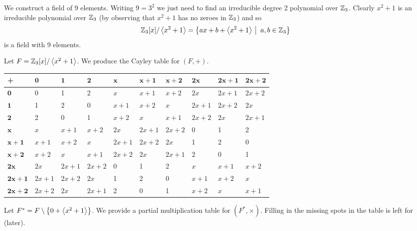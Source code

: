 \begin{example}\label{example-Z3/<x^2+1>}
    We construct a field of 9 elements. Writing $9 = 3^2$ we just need to find an irreducible degree 2 polynomial over $\mathbb{Z}_3$. Clearly $x^2 + 1$ is an irreducible polynomial over $\mathbb{Z}_3$ (by observing that $x^2 + 1$ has no zeroes in $\mathbb{Z}_3$) and so
    \[
        \Z_3[x]/\princ{x^2+1} = \left\{ax+b + \princ{x^2+1} \vert a,b \in \Z_3\right\}
    \]
    is a field with 9 elements.

    Let $F = \mathbb{Z}_3[x]/\left\langle x^2+1\right\rangle$. We produce the Cayley table for $(F, +)$.
    \begin{table}[H]
        \centering
        \fontsize{7pt}{10pt}\selectfont
        \begin{tabular}{|l|l|l|l|l|l|l|l|l|l|}
            \hline
            \textbf{+} & $\boldsymbol{0}$ & $\boldsymbol{1}$ & $\boldsymbol{2}$ & $\boldsymbol{x}$ & $\boldsymbol{x+1}$ & $\boldsymbol{x+2}$ & $\boldsymbol{2x}$ & $\boldsymbol{2x+1}$ & $\boldsymbol{2x+2}$ \\ \hline
            $\boldsymbol{0}$ & 0 & 1 & 2 & $x$ & $x+1$ & $x+2$ & $2x$ & $2x+1$ & $2x+2$ \\ \hline
            $\boldsymbol{1}$ & 1 & 2 & 0 & $x+1$ & $x+2$ & $x$ & $2x+1$ & $2x+2$ & $2x$ \\ \hline
            $\boldsymbol{2}$ & 2 & 0 & 1 & $x+2$ & $x$ & $x+1$ & $2x+2$ & $2x$ & $2x+1$ \\ \hline
            $\boldsymbol{x}$ & $x$ & $x+1$ & $x+2$ & $2x$ & $2x+1$ & $2x+2$ & 0 & 1 & 2 \\ \hline
            $\boldsymbol{x+1}$ & $x+1$ & $x+2$ & $x$ & $2x+1$ & $2x+2$ & $2x$ & 1 & 2 & 0 \\ \hline
            $\boldsymbol{x+2}$ & $x+2$ & $x$ & $x+1$ & $2x+2$ & $2x$ & $2x+1$ & 2 & 0 & 1 \\ \hline
            $\boldsymbol{2x}$ & $2x$ & $2x+1$ & $2x+2$ & 0 & 1 & 2 & $x$ & $x+1$ & $x+2$ \\ \hline
            $\boldsymbol{2x+1}$ & $2x+1$ & $2x+2$ & $2x$ & 1 & 2 & 0 & $x+1$ & $x+2$ & $x$ \\ \hline
            $\boldsymbol{2x+2}$ & $2x+2$ & $2x$ & $2x+1$ & 2 & 0 & 1 & $x+2$ & $x$ & $x+1$ \\ \hline
        \end{tabular}
    \end{table}

    Let $F^\ast = F \setminus \left\{0 + \left\langle x^2+1\right\rangle\right\}$. We provide a partial multiplication table for $(F^\ast, \times)$. Filling in the missing spots in the table is left for  (later).


\end{example}

